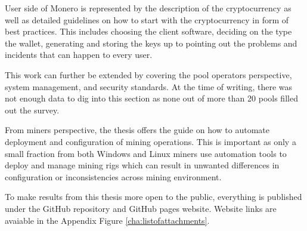 \documentclass[
  printed, %
  table,   %
  lof,     %
  lot,     %
           oneside, color
]{fithesis3}
\begin{document}
User side of Monero is represented by the description of the cryptocurrency as well as detailed guidelines on how to start with the cryptocurrency in form of best practices. This includes choosing the client software, deciding on the type the wallet, generating and storing the keys up to pointing out the problems and incidents that can happen to every user.

This work can further be extended by covering the pool operators perspective,  system management, and security standards. At the time of writing, there was not enough data to dig into this section as none out of more than 20 pools filled out the survey.

From miners perspective, the thesis offers the guide on how to automate deployment and configuration of mining operations. This is important as only a small fraction from both Windows and Linux miners use automation tools to deploy and manage mining rigs which can result in unwanted differences in configuration or inconsistencies across mining environment.

To make results from this thesis more open to the public, everything is published under the GitHub repository and GitHub pages website. Website links are avaiable in the Appendix Figure \ref{cha:listofattachments}.



\setlength{\emergencystretch}{3em}
\printbibliography[heading=bibintoc]
\let\cleardoublepage\clearpage
\begingroup
\let\cleardoublepage\clearpage
\appendix
\end{document}
